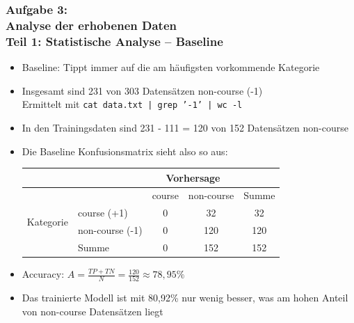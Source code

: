 \documentclass[accentcolor=tud7b,noresetcounter]{tudbeamer}
\begin{document}
	\begin{frame}
		\frametitle{Aufgabe 3:\\ Analyse der erhobenen Daten\\ Teil 1: Statistische Analyse -- Baseline}
		\begin{itemize}
			\item Baseline: Tippt immer auf die am häufigsten vorkommende Kategorie
			\item Insgesamt sind 231 von 303 Datensätzen non-course (-1) \\
			      Ermittelt mit \texttt{cat data.txt | grep '-1' | wc -l}
			\item In den Trainingsdaten sind 231 - 111 = 120 von 152 Datensätzen non-course
			\item Die Baseline Konfusionsmatrix sieht also so aus: \\
			\begin{tabular}{|l|l|c|c||c|}
		\hline
			& & \multicolumn{2}{c|}{Vorhersage} & \\
			\hline
			& & course & non-course & Summe \\
			\hline
		\multirow{2}{*}{Kategorie} & course (+1) & 0 & 32 & 32 \\
		\cline{2-5}
		& non-course (-1) & 0  & 120 & 120\\
		\hline
		& Summe & 0 & 152 & 152 \\
		\hline
		\end{tabular}
			\item Accuracy: $A = \frac{TP + TN}{N} = \frac{120}{152} \approx 78,95\%$
			\item Das trainierte Modell ist mit 80,92\% nur wenig besser, was am hohen Anteil von non-course Datensätzen liegt
		\end{itemize}
	\end{frame}
	
\end{document}
